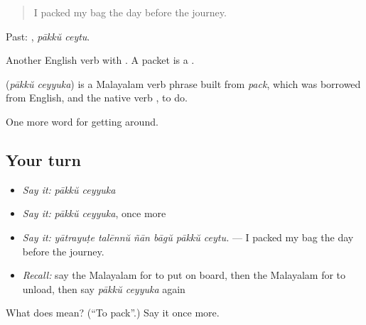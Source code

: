 \begin{quote}
I packed my bag the day before the journey.
\end{quote}

Past:  , \emph{pākkŭ ceytu}.

Another English verb with . A packet is a .

\begin{cousinweb}
\textbf{ } (\emph{pākkŭ ceyyuka}) is a Malayalam verb phrase built from \emph{pack}, which was borrowed from English, and the native verb , to do.
\end{cousinweb}

\begin{grammarlens}[title={What you've built}]
One more word for getting around.
\end{grammarlens}

\subsection*{Your turn}
\begin{itemize}
\raggedright
  \item \emph{Say it:} \emph{pākkŭ ceyyuka}
  \item \emph{Say it:} \emph{pākkŭ ceyyuka}, once more
  \item \emph{Say it:} \emph{yātrayuṭe talēnnŭ ñān bāgŭ pākkŭ ceytu.} — I packed my bag the day before the journey.
  \item \emph{Recall:} say the Malayalam for to put on board, then the Malayalam for to unload, then say \emph{pākkŭ ceyyuka} again
\end{itemize}

\begin{tcolorbox}[breakable,colback=teal!4,colframe=teal!35!black,title={Before you move on}]
What does   mean? (\textquotedblleft{}To pack\textquotedblright{}.) Say it once more.
\end{tcolorbox}
